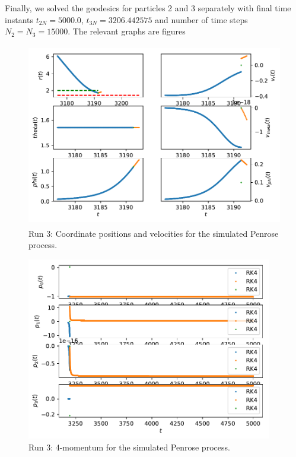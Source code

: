 Finally, we solved the geodesics for particles 2 and 3 separately with final time instants $t_{2N}=5000.0$, $t_{3N}=3206.442575$ and number of time steps $N_2 = N_3 = 15000$. The relevant graphs are figures %

\begin{figure}
	\centering
	\includegraphics[height=8cm]{Figures/xv_t_Penrose.pdf}
	\caption[Run 3: Coordinate positions and velocities]{Run 3: Coordinate positions and velocities for the simulated Penrose process.}
	\label{fig:RUN3_xv}
\end{figure}

\begin{figure}
	\centering
	\includegraphics[height=8cm]{Figures/U_t_Penrose.pdf}
	\caption[Run 3: 4-momentum]{Run 3: 4-momentum for the simulated Penrose process.}
	\label{fig:RUN3_U}
\end{figure}